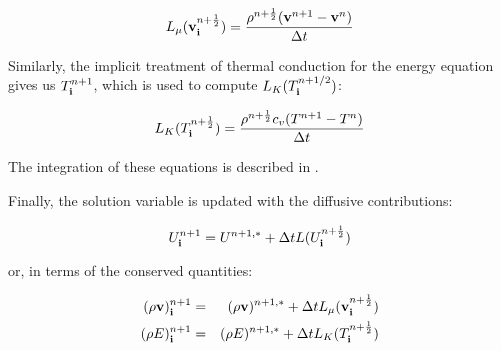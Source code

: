 \begin{equation}
L_\mu(\mathbf{v}^{n+\frac{1}{2}}_{\bf i}) = \frac{\rho^{n+\frac{1}{2}}(\mathbf{v}^{n+1} - \mathbf{v}^n)}{\Delta t}
\end{equation}

\noindent
Similarly, the implicit treatment of thermal conduction for the energy equation
gives us $T^{n+1}_{\bf i}$, which is used to compute $L_K(T^{n+1/2}_{\bf i})$:

\begin{equation}
L_K(T^{n+\frac{1}{2}}_{\bf i}) = \frac{\rho^{n+\frac{1}{2}} c_v (T^{n+1} - T^n)}{\Delta t}
\end{equation}

The integration of these equations is described in . 

Finally, the solution variable is updated with the diffusive contributions:

\begin{equation}
U^{n+1}_{\bf i} = U^{n+1,*} + \Delta t L(U^{n+\frac{1}{2}}_{\bf i}) \label{eq:Uupdate}
\end{equation}

\noindent
or, in terms of the conserved quantities:

\begin{eqnarray}
(\rho\mathbf{v})^{n+1}_{\bf i} &=& (\rho\mathbf{v})^{n+1,*} + \Delta t L_\mu(\mathbf{v}^{n+\frac{1}{2}}_{\bf i}) \label{eq:rhovupdate} \\
(\rho E)^{n+1}_{\bf i} &=& (\rho E)^{n+1,*} + \Delta t L_K(T^{n+\frac{1}{2}}_{\bf i}) \label{eq:rhoEupdate}
\end{eqnarray}

